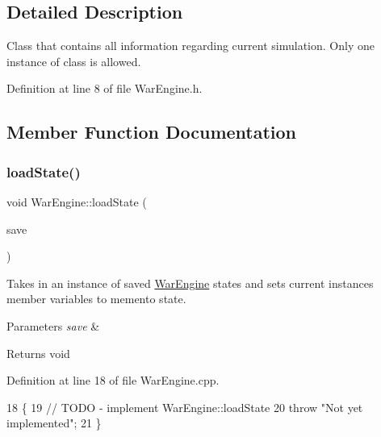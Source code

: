 \subsection{Detailed Description}
Class that contains all information regarding current simulation. Only one instance of class is allowed. 

Definition at line 8 of file War\+Engine.\+h.



\subsection{Member Function Documentation}
\mbox{\label{classWarEngine_a76994dd9d009fff3dd272a87710bfae5}} 
\subsubsection{\texorpdfstring{load\+State()}{loadState()}}
{\footnotesize\ttfamily void War\+Engine\+::load\+State (\begin{DoxyParamCaption}\item[{\hyperlink{classWarEngineState}{War\+Engine\+State}}]{save }\end{DoxyParamCaption})}



Takes in an instance of saved \hyperlink{classWarEngine}{War\+Engine} states and sets current instance\textquotesingle{}s member variables to memento state. 


\begin{DoxyParams}{Parameters}
{\em save} & \\
\hline
\end{DoxyParams}
\begin{DoxyReturn}{Returns}
void 
\end{DoxyReturn}


Definition at line 18 of file War\+Engine.\+cpp.


\begin{DoxyCode}
18                                              \{
19     \textcolor{comment}{// TODO - implement WarEngine::loadState}
20     \textcolor{keywordflow}{throw} \textcolor{stringliteral}{"Not yet implemented"};
21 \}
\end{DoxyCode}
\mbox{\label{classWarEngine_a3ce98b4a76487348a712a4ffb54a71f2}} 
